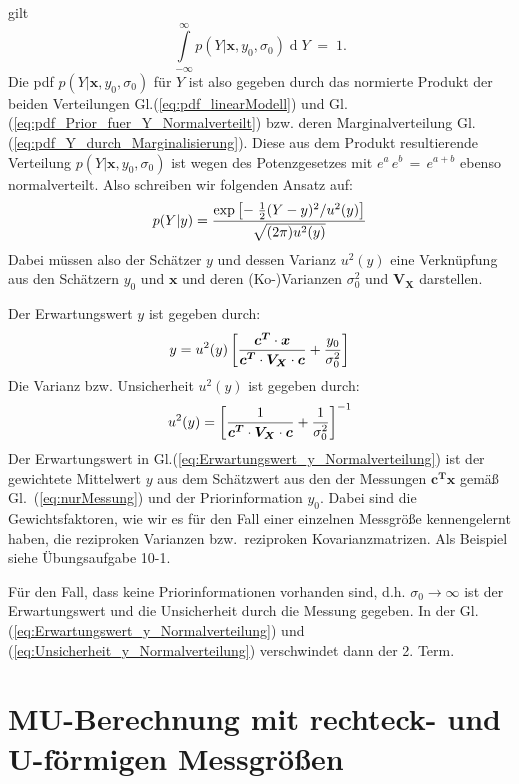 gilt
$$
\int\limits_{-\infty}^{\infty} p(Y | \boldsymbol{x}, y_0, \sigma_0) 
\operatorname{d}Y \; = \; 1 .
$$
Die pdf $p(Y | \boldsymbol{x}, y_0, \sigma_0)$ für $Y$ ist also gegeben durch das normierte 
Produkt der beiden Verteilungen Gl.(\ref{eq:pdf_linearModell}) und 
Gl.(\ref{eq:pdf_Prior_fuer_Y_Normalverteilt})
bzw. deren Marginalverteilung Gl.(\ref{eq:pdf_Y_durch_Marginalisierung}).
Diese aus dem Produkt resultierende Verteilung $p(Y | \boldsymbol{x}, y_0, \sigma_0)$ ist 
wegen des Potenzgesetzes mit $e^a \, e^b \, = \, e^{a+b}$ ebenso normalverteilt. Also
schreiben wir folgenden Ansatz auf:
\begin{equation}
p(Y| y) =  \frac{\textstyle \exp \left[- \; \frac{1}{2} (Y - y)^2/u^2(y) \right]}{\textstyle \sqrt{(2 \pi) u^2(y)}}
\end{equation}
Dabei müssen also der Schätzer $y$ und dessen Varianz $u^2(y)$ eine Verknüpfung aus
den Schätzern $y_0$ und $\boldsymbol{x}$ und deren (Ko-)Varianzen $\sigma_0^2$ und
$\boldsymbol{V_X}$ darstellen.

Der Erwartungswert $y$ ist gegeben durch: 
\begin{equation}
y = u^2(y) \left[\frac{\textstyle \boldsymbol{c^T} \cdot \boldsymbol{x}}
{\textstyle \boldsymbol{c^T}\cdot\boldsymbol{V_X} \cdot \boldsymbol{c}} + 
\frac{\textstyle y_0}{\textstyle \sigma_0^2} \right]
\label{eq:Erwartungswert_y_Normalverteilung}
\end{equation}
Die Varianz bzw. Unsicherheit $u^2(y)$ ist gegeben durch:
\begin{equation}
u^2(y) =  \left[\frac{1}
{\textstyle \boldsymbol{c^T}\cdot\boldsymbol{V_X} \cdot \boldsymbol{c}} + 
\frac{\textstyle 1}{\textstyle \sigma_0^2} \right]^{-1}
\label{eq:Unsicherheit_y_Normalverteilung}
\end{equation}
Der Erwartungswert in Gl.(\ref{eq:Erwartungswert_y_Normalverteilung})
ist der gewichtete Mittelwert $y$ aus dem Schätzwert aus den
der Messungen $\boldsymbol{c^T}\boldsymbol{x}$ gemäß Gl.~(\ref{eq:nurMessung}) und
der Priorinformation $y_0$. Dabei sind die Gewichtsfaktoren, wie wir es
für den Fall einer einzelnen Messgröße kennengelernt haben, die reziproken
Varianzen bzw.\ reziproken Kovarianzmatrizen. Als Beispiel siehe Übungsaufgabe 10-1.

Für den Fall, dass keine Priorinformationen vorhanden sind, d.h. 
$\sigma_0 \rightarrow \infty$ ist der Erwartungswert und die Unsicherheit durch die Messung gegeben.
In der Gl. (\ref{eq:Erwartungswert_y_Normalverteilung}) und (\ref{eq:Unsicherheit_y_Normalverteilung}) verschwindet dann der 2. Term.
\section{MU-Berechnung mit rechteck- und U-förmigen Messgrößen}
